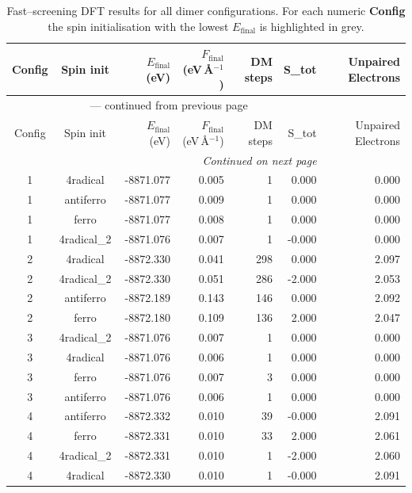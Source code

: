 
\begin{longtable}{@{}ccrrrrr@{}}
\caption{Fast–screening DFT results for all dimer configurations.
         For each numeric \textbf{Config} the spin initialisation with the
         lowest $E_{\mathrm{final}}$ is highlighted in grey.}\label{tab:dimer_full}\\
\toprule
Config & Spin init & $E_{\mathrm{final}}$ (eV) &
$F_{\mathrm{final}}$ (eV\,\AA$^{-1}$) & DM steps & S_{tot} & Unpaired Electrons\\
\midrule
\endfirsthead
\multicolumn{6}{c}{{\tablename}~\thetable{} — continued from previous page}\\
\toprule
Config & Spin init & $E_{\mathrm{final}}$ (eV) &
$F_{\mathrm{final}}$ (eV\,\AA$^{-1}$) & DM steps & S_{tot} & Unpaired Electrons\\
\midrule
\endhead
\midrule
\multicolumn{6}{r}{\emph{Continued on next page}}\\
\endfoot
\bottomrule
\endlastfoot
\rowcolor{gray!20} 1 & 4radical & -8871.077 & 0.005 & 1 & 0.000 & 0.000 \\
1 & antiferro & -8871.077 & 0.009 & 1 & 0.000 & 0.000 \\
1 & ferro & -8871.077 & 0.008 & 1 & 0.000 & 0.000 \\
1 & 4radical\_2 & -8871.076 & 0.007 & 1 & -0.000 & 0.000 \\
\rowcolor{gray!20} 2 & 4radical & -8872.330 & 0.041 & 298 & 0.000 & 2.097 \\
2 & 4radical\_2 & -8872.330 & 0.051 & 286 & -2.000 & 2.053 \\
2 & antiferro & -8872.189 & 0.143 & 146 & 0.000 & 2.092 \\
2 & ferro & -8872.180 & 0.109 & 136 & 2.000 & 2.047 \\
\rowcolor{gray!20} 3 & 4radical\_2 & -8871.076 & 0.007 & 1 & 0.000 & 0.000 \\
3 & 4radical & -8871.076 & 0.006 & 1 & 0.000 & 0.000 \\
3 & ferro & -8871.076 & 0.007 & 3 & 0.000 & 0.000 \\
3 & antiferro & -8871.076 & 0.006 & 1 & 0.000 & 0.000 \\
\rowcolor{gray!20} 4 & antiferro & -8872.332 & 0.010 & 39 & -0.000 & 2.091 \\
4 & ferro & -8872.331 & 0.010 & 33 & 2.000 & 2.061 \\
4 & 4radical\_2 & -8872.331 & 0.010 & 1 & -2.000 & 2.060 \\
4 & 4radical & -8872.330 & 0.010 & 1 & -0.000 & 2.091 \\
\end{longtable}